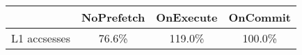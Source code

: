 \begin{tabular}{ l|ccc }
 & NoPrefetch & OnExecute & OnCommit\\ \hline
L1 accsesses & 76.6\% & 119.0\% & 100.0\%\\ \hline
\end{tabular}

